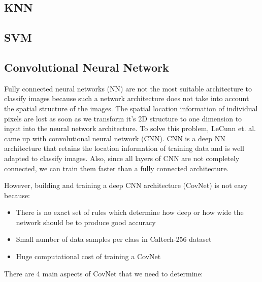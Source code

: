 \documentclass{article} %
\begin{document}
\subsection{KNN}

\subsection{SVM}


\subsection{Convolutional Neural Network}
Fully connected neural networks (NN) are not the most suitable architecture to classify images because such a network architecture does not take into account the spatial structure of the images. The spatial location information of individual pixels are lost as soon as we transform it's 2D structure to one dimension to input into the neural network architecture. To solve this problem, LeCunn et. al. came up with convolutional neural network (CNN). CNN is a deep NN architecture that retains the location information of training data and is well adapted to classify images. Also, since all layers of CNN are not completely connected, we can train them faster than a fully connected architecture. 
\par However, building and training a deep CNN architecture (CovNet) is not easy because:

\begin{itemize}
\item
There is no exact set of rules which determine how deep or how wide the network should be to produce good accuracy
\item
Small number of data samples per class in Caltech-256 dataset
\item
Huge computational cost of training a CovNet
\end{itemize}

There are 4 main aspects of CovNet that we need to determine:
\end{document}
